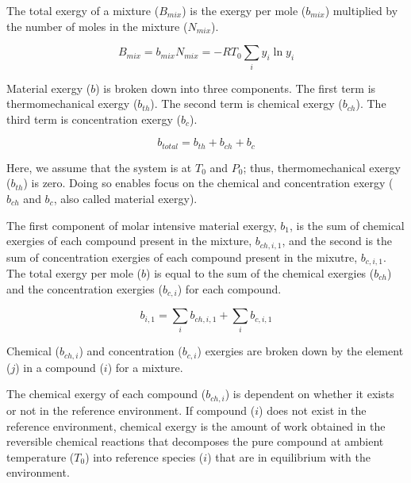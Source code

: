 \documentclass[energies,article,submit,pdftex,moreauthors]{Definitions/mdpi}
\begin{document}
The total exergy of a mixture ($B_{mix}$) is the exergy per mole ($b_{mix}$)
multiplied by the number of moles
in the mixture ($N_{mix}$).

\begin{equation}\label{eq:specific_exergy_of_mixture_definition2}
  B_{mix} = {b_{mix}}{N_{mix}} = -RT_{0}\sum_{i}y_{i}\ln{y_{i}}
\end{equation}

Material exergy ($b$) is broken down into three components.
The first term is thermomechanical exergy ($b_{th}$).
The second term is chemical exergy ($b_{ch}$).
The third term is concentration exergy ($b_{c}$).

\begin{equation}\label{eq:general_material_exergy_definition}
 b_{total} = b_{th} + b_{ch} + b_{c}
\end{equation}

Here, we assume that the system is at
$T_{0}$ and $P_{0}$;
thus, thermomechanical exergy ($b_{th}$) is zero.
Doing so enables focus on the chemical and concentration exergy
($b_{ch}$ and $b_{c}$, also called material exergy).

The first component of molar intensive material exergy, $b_{1}$,
is the sum of chemical exergies of each compound
present in the mixture, $b_{ch,i,1}$,
and the second is the sum of concentration exergies of each compound
present in the mixutre, $b_{c,i,1}$.
The total exergy per mole ($b$) is equal to the sum of the chemical exergies ($b_{ch}$)
and the concentration exergies ($b_{c,i}$) for each compound.

\begin{equation}\label{eq:specific_molar_intensive_exergy_definition}
  b_{i,1} = \sum_{i}{b_{ch,i,1}} + \sum_{i}{b_{c,i,1}}
\end{equation}



Chemical ($b_{ch,i}$) and concentration ($b_{c,i}$) exergies are broken down
by the element ($j$) in a compound ($i$)
for a mixture.

The chemical exergy of each compound ($b_{ch,i}$) is dependent
on whether it exists or not
in the reference environment.
If compound ($i$) does not exist
in the reference environment,
chemical exergy is the amount of work obtained
in the reversible chemical reactions
that decomposes the pure compound at ambient temperature ($T_{0}$)
into reference species ($i$) that are in equilibrium
with the environment.
\end{document}
